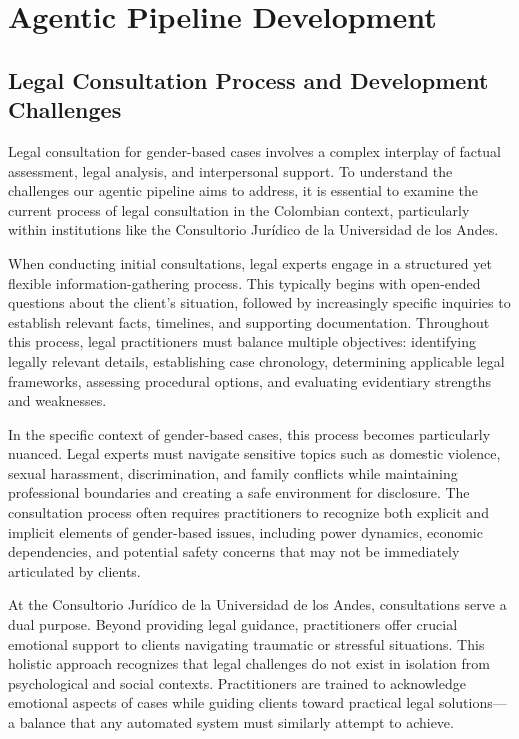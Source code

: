 \section{Agentic Pipeline Development}
\subsection{Legal Consultation Process and Development Challenges}
Legal consultation for gender-based cases involves a complex interplay of factual assessment, 
legal analysis, and interpersonal support. To understand the challenges our agentic pipeline 
aims to address, it is essential to examine the current process of legal consultation in the 
Colombian context, particularly within institutions like the Consultorio Jurídico de la Universidad de los Andes.

When conducting initial consultations, legal experts engage in a structured yet flexible 
information-gathering process. This typically begins with open-ended questions about the 
client's situation, followed by increasingly specific inquiries to establish relevant facts, 
timelines, and supporting documentation. Throughout this process, legal practitioners must 
balance multiple objectives: identifying legally relevant details, establishing case chronology, 
determining applicable legal frameworks, assessing procedural options, and evaluating evidentiary 
strengths and weaknesses.

In the specific context of gender-based cases, this process becomes particularly nuanced. 
Legal experts must navigate sensitive topics such as domestic violence, sexual harassment, 
discrimination, and family conflicts while maintaining professional boundaries and creating 
a safe environment for disclosure. The consultation process often requires practitioners to 
recognize both explicit and implicit elements of gender-based issues, including power dynamics, 
economic dependencies, and potential safety concerns that may not be immediately articulated by clients.

At the Consultorio Jurídico de la Universidad de los Andes, consultations serve a dual purpose. 
Beyond providing legal guidance, practitioners offer crucial emotional support to clients navigating 
traumatic or stressful situations. This holistic approach recognizes that legal challenges do 
not exist in isolation from psychological and social contexts. Practitioners are trained to 
acknowledge emotional aspects of cases while guiding clients toward practical legal 
solutions—a balance that any automated system must similarly attempt to achieve.


